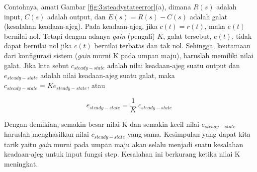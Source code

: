 Contohnya, amati Gambar \ref{fig:3:steadystateerror}(a), dimana $R(s)$ adalah input, $C(s)$ adalah output, dan $E(s) = R(s) - C(s)$ adalah galat (kesalahan keadaan-ajeg). Pada keadaan-ajeg, jika $c(t) = r(t)$, maka $e(t)$ bernilai nol. Tetapi dengan adanya \textit{gain} (pengali) $K$, galat tersebut, $e(t)$, tidak dapat bernilai nol jika $c(t)$ bernilai terbatas dan tak nol. Sehingga, keutamaan dari konfigurasi sistem (\textit{gain} murni K pada umpan maju), haruslah memiliki nilai galat. Jika kita sebut $c_{steady-state}$ adalah nilai keadaan-ajeg suatu output dan $e_{steady-state}$ adalah nilai keadaan-ajeg suatu galat, maka $c_{steady-state} = K e_{steady-state}$, atau 

\begin{equation} \label{eq:3:steady-state-error}
e_{steady-state} = \frac{1}{K} \ c_{steady-state}
\end{equation}

Dengan demikian, semakin besar nilai K dan semakin kecil nilai $e_{steady-state}$ haruslah menghasilkan nilai $c_{steady-state}$ yang sama. Kesimpulan yang dapat kita tarik yaitu \textit{gain} murni pada umpan maju akan selalu menjadi suatu kesalahan keadaan-ajeg untuk input fungsi step. Kesalahan ini berkurang ketika nilai K meningkat.



